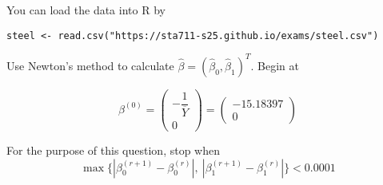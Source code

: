 \documentclass[11pt]{article}
\begin{document}
\begin{enumerate}
\noindent You can load the data into R by
\begin{verbatim}
steel <- read.csv("https://sta711-s25.github.io/exams/steel.csv")
\end{verbatim}

Use Newton's method to calculate $\widehat{\beta} = (\widehat{\beta}_0, \widehat{\beta}_1)^T$. Begin at 

$$\beta^{(0)} = \begin{pmatrix}
- \dfrac{1}{\overline{Y}} \\ 0
\end{pmatrix} = \begin{pmatrix}
-15.18397 \\ 0
\end{pmatrix}$$

For the purpose of this question, stop when 
$$\max \{ |\beta_0^{(r+1)} - \beta_0^{(r)}|, \ |\beta_1^{(r+1)} - \beta_1^{(r)}| \} < 0.0001$$

\end{enumerate}
\end{document}
